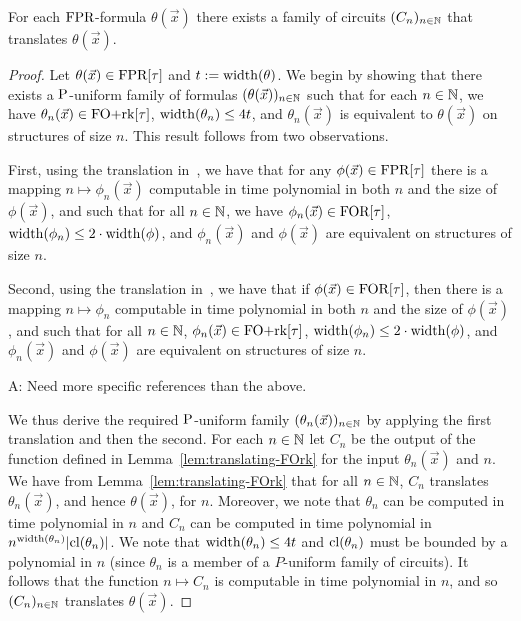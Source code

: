 \documentclass[../paper.tex]{subfiles}
\begin{document}
\begin{thm}
  For each $\text{\upshape FPR}$-formula $\theta(\vec{x})$ there exists a family of circuits
  $(C_n)_{n \in \mathbb{N}}$ that translates $\theta(\vec{x})$.
  \label{thm:translating-formulas-to-circuits}
\end{thm}
\begin{proof}
  Let $\theta(\vec{x}) \in \text{\upshape FPR}[\tau]$ and $t := \mathrm{width} (\theta)$. We begin by
  showing that there exists a $\mathrm{P}$-uniform family of formulas
  $(\theta(\vec{x}))_{n \in \mathbb{N}}$ such that for each $n \in \mathbb{N}$, we have
  $\theta_n(\vec{x}) \in \text{\upshape FO+rk}[\tau]$, $\mathrm{width}(\theta_n) \leq 4 t$, and
  $\theta_n(\vec{x})$ is equivalent to $\theta(\vec{x})$ on structures of size
  $n$. This result follows from two observations.

  First, using the translation in~\cite{Dawar09logicswith}, we have that for any
  $\phi(\vec{x}) \in \text{\upshape FPR}[\tau]$ there is a mapping $n \mapsto \phi_n(\vec{x})$
  computable in time polynomial in both $n$ and the size of $\phi(\vec{x})$, and
  such that for all $n \in \mathbb{N}$, we have $\phi_n(\vec{x}) \in \text{\upshape FOR}[\tau]$,
  $\mathrm{width} (\phi_n) \leq 2 \cdot \mathrm{width} (\phi)$, and $\phi_n(\vec{x})$ and
  $\phi(\vec{x})$ are equivalent on structures of size $n$.

  Second, using the translation in~\cite{libkin2004elements}, we have that if
  $\phi (\vec{x}) \in \text{\upshape FOR}[\tau]$, then there is a mapping $n \mapsto \phi_n$
  computable in time polynomial in both $n$ and the size of $\phi(\vec{x})$, and
  such that for all $n \in \mathbb{N}$, $\phi_n(\vec{x}) \in \text{\upshape FO+rk}[\tau]$,
  $\mathrm{width}(\phi_n) \leq 2 \cdot \mathrm{width}(\phi)$, and $\phi_n(\vec{x})$ and
  $\phi(\vec{x})$ are equivalent on structures of size $n$.

  \begin{remark}
    A: Need more specific references than the above.
  \end{remark}

  We thus derive the required $\mathrm{P}$-uniform family $(\theta_n(\vec{x}))_{n \in
    \mathbb{N}}$ by applying the first translation and then the second. For each $n
  \in \mathbb{N}$ let $C_n$ be the output of the function defined in
  Lemma~\ref{lem:translating-FOrk} for the input $\theta_n(\vec{x})$ and $n$. We
  have from Lemma~\ref{lem:translating-FOrk} that for all $n \in \mathbb{N}$, $C_n$
  translates $\theta_n(\vec{x})$, and hence $\theta(\vec{x})$, for $n$.
  Moreover, we note that $\theta_n$ can be computed in time polynomial in $n$
  and $C_n$ can be computed in time polynomial in $n^{\mathrm{width}(\theta_n)} \vert
  \mathrm{cl}(\theta_n) \vert$. We note that $\mathrm{width}(\theta_n) \leq 4t$ and
  $\mathrm{cl}(\theta_n)$ must be bounded by a polynomial in $n$ (since $\theta_n$ is a
  member of a $P$-uniform family of circuits). It follows that the function $n
  \mapsto C_n$ is computable in time polynomial in $n$, and so $(C_n)_{n \in
    \mathbb{N}}$ translates $\theta(\vec{x})$.
\end{proof}
\end{document}
